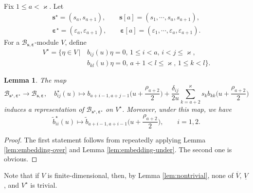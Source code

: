 \documentclass[11pt,reqno]{amsart}
\numberwithin{equation}{section}
\newtheorem{lem}[thm]{Lemma}
\theoremstyle{definition}
\theoremstyle{remark}
\newcommand{\beq}{\begin{equation}}
\newcommand{\eeq}{\end{equation}}
\newcommand{\tl}{\tilde}
\newcommand{\lle}{\leqslant}
\newcommand{\YMN}{{\mathscr{Y}_{\bm s}}}
\newcommand{\BMN}{{\mathscr{B}_{\bm s,\bm \ve}}}
\newcommand{\ka}{\varkappa}
\newcommand{\ve}{\varepsilon}
\newcommand{\s}{{\bm s}}
\begin{document}
Fix $1\lle a<\ka$. Let
\beq\label{star}
\begin{split}
   \s^\star=(s_{a},s_{a+1}),\qquad \bm \s[a]=(s_1,\cdots,s_{a},s_{a+1}),\\
   \bm\ve^\star=(\ve_{a},\ve_{a+1}),\qquad \bm \ve[a]=(\ve_1,\cdots,\ve_{a},\ve_{a+1}).
\end{split}
\eeq
For a $\BMN$-module $V$, define
\beq\label{vstar}
\begin{split}
V^\star=\{\eta\in V\,|\,& b_{ij}(u)\eta=0,\, 1\lle i< a,\, i<j\lle \ka,\\
&b_{kl}(u)\eta=0,\, a+1< l \lle \ka,\, 1\lle k<l\}.
\end{split}
\eeq
\begin{lem}\label{B2reduction}
The map
\[
\mathscr B_{\s^\star,\bm\ve^\star}\to \BMN,\quad b_{ij}^\star(u)\mapsto b_{a+i-1,a+j-1}\Big(u+\frac{\rho_{a+2}}{2}\Big)+\frac{\delta_{ij}}{2u}\sum_{k=a+2}^\ka s_k b_{kk}\Big(u+\frac{\rho_{a+2}}{2}\Big)
\]
induces a representation of $\mathscr B_{\s^\star,\bm\ve^\star}$ on $V^\star$. Moreover, under this map, we have
\[
\tl b_{ii}^\star(u)\mapsto \tl b_{a+i-1,a+i-1}\Big(u+\frac{\rho_{a+2}}{2}\Big),\qquad i=1,2.
\]
\end{lem}
\begin{proof}
The first statement follows from repeatedly applying Lemma \ref{lem:embedding-over} and Lemma \ref{lem:embedding-under}. The second one is obvious.
\end{proof}
Note that if $V$ is finite-dimensional, then, by Lemma \ref{lem:nontrivial}, none of $\overline V$, $\underline V$, and $V^\star$ is trivial.

\end{document}
